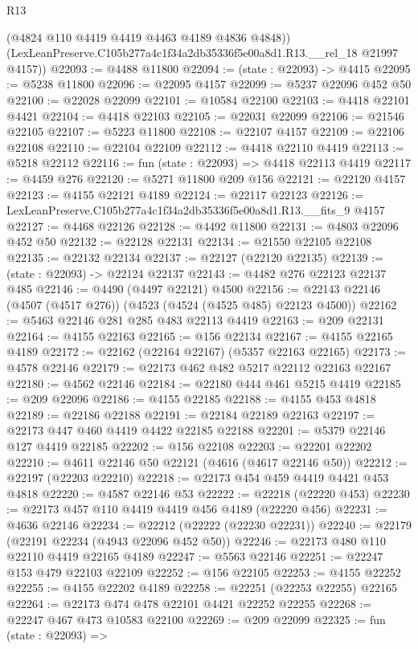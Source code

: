 \begin{lexlean}{R13}
\begin{coremodule}
        (@4824 @110 @4419 @4419 @4463 @4189 @4836 @4848))
      (LexLeanPreserve.C105b277a4c1f34a2db35336f5e00a8d1.R13.__rel_18 @21997 @4157))
@22093 := @4488 @11800
@22094 := (state : @22093) -> @4415
@22095 := @5238 @11800
@22096 := @22095 @4157
@22099 := @5237 @22096 @452 @50
@22100 := @22028 @22099
@22101 := @10584 @22100
@22103 := @4418 @22101 @4421
@22104 := @4418 @22103
@22105 := @22031 @22099
@22106 := @21546 @22105
@22107 := @5223 @11800
@22108 := @22107 @4157
@22109 := @22106 @22108
@22110 := @22104 @22109
@22112 := @4418 @22110 @4419
@22113 := @5218 @22112
@22116 := fun (state : @22093) => @4418 @22113 @4419
@22117 := @4459 @276
@22120 := @5271 @11800 @209 @156
@22121 := @22120 @4157
@22123 := @4155 @22121 @4189
@22124 := @22117 @22123
@22126 := LexLeanPreserve.C105b277a4c1f34a2db35336f5e00a8d1.R13.__fits_9 @4157
@22127 := @4468 @22126
@22128 := @4492 @11800
@22131 := @4803 @22096 @452 @50
@22132 := @22128 @22131
@22134 := @21550 @22105 @22108
@22135 := @22132 @22134
@22137 := @22127 (@22120 @22135)
@22139 := (state : @22093) -> @22124 @22137
@22143 := @4482 @276 @22123 @22137 @485
@22146 := @4490 (@4497 @22121) @4500
@22156 := @22143 @22146 (@4507 (@4517 @276)) (@4523 (@4524 (@4525 @485) @22123 @4500))
@22162 := @5463 @22146 @281 @285 @483 @22113 @4419
@22163 := @209 @22131
@22164 := @4155 @22163
@22165 := @156 @22134
@22167 := @4155 @22165 @4189
@22172 := @22162 (@22164 @22167) (@5357 @22163 @22165)
@22173 := @4578 @22146
@22179 := @22173 @462 @482 @5217 @22112 @22163 @22167
@22180 := @4562 @22146
@22184 := @22180 @444 @461 @5215 @4419
@22185 := @209 @22096
@22186 := @4155 @22185
@22188 := @4155 @453 @4818
@22189 := @22186 @22188
@22191 := @22184 @22189 @22163
@22197 := @22173 @447 @460 @4419 @4422 @22185 @22188
@22201 := @5379 @22146 @127 @4419 @22185
@22202 := @156 @22108
@22203 := @22201 @22202
@22210 := @4611 @22146 @50 @22121 (@4616 (@4617 @22146 @50))
@22212 := @22197 (@22203 @22210)
@22218 := @22173 @454 @459 @4419 @4421 @453 @4818
@22220 := @4587 @22146 @53
@22222 := @22218 (@22220 @453)
@22230 := @22173 @457 @110 @4419 @4419 @456 @4189 (@22220 @456)
@22231 := @4636 @22146
@22234 := @22212 (@22222 (@22230 @22231))
@22240 := @22179 (@22191 @22234 (@4943 @22096 @452 @50))
@22246 := @22173 @480 @110 @22110 @4419 @22165 @4189
@22247 := @5563 @22146
@22251 := @22247 @153 @479 @22103 @22109
@22252 := @156 @22105
@22253 := @4155 @22252
@22255 := @4155 @22202 @4189
@22258 := @22251 (@22253 @22255) @22165
@22264 := @22173 @474 @478 @22101 @4421 @22252 @22255
@22268 := @22247 @467 @473 @10583 @22100
@22269 := @209 @22099
@22325 := fun (state : @22093) =>

\end{coremodule}
\end{lexlean}
